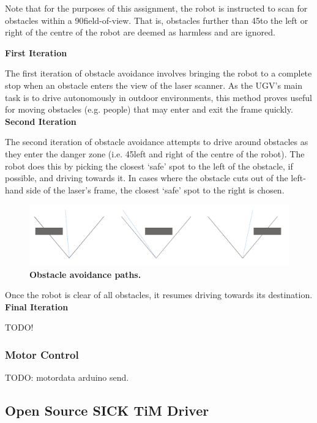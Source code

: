 \documentclass[titlepage,12pt,a4paper]{article}
\begin{document}
Note that for the purposes of this assignment, the robot is instructed to scan for obstacles within a 90\degree field-of-view. That is, obstacles further than 45\degree to the left or right of the centre of the robot are deemed as harmless and are ignored.

\textbf{First Iteration}

The first iteration of obstacle avoidance involves bringing the robot to a complete stop when an obstacle enters the view of the laser scanner. As the UGV's main task is to drive autonomously in outdoor environments, this method proves useful for moving obstacles (e.g. people) that may enter and exit the frame quickly. \\

\textbf{Second Iteration}

The second iteration of obstacle avoidance attempts to drive around obstacles as they enter the danger zone (i.e. 45\degree left and right of the centre of the robot). The robot does this by picking the closest `safe' spot to the left of the obstacle, if possible, and driving towards it. In cases where the obstacle cuts out of the left-hand side of the laser's frame, the closest `safe' spot to the right is chosen. 

\begin{figure}[h]
	\centering
	\includegraphics[scale=0.17]{obstacle2.png}
	\caption{\textbf{Obstacle avoidance paths.}}
\end{figure}

Once the robot is clear of all obstacles, it resumes driving towards its destination. \\

\textbf{Final Iteration}

TODO!




\subsubsection{Motor Control}

TODO: motordata arduino send. 

\subsection{Open Source SICK TiM Driver}
\end{document}
